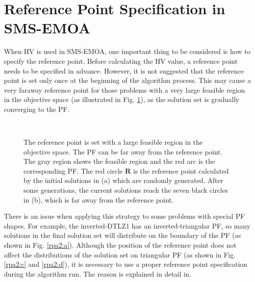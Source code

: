 \documentclass[conference]{IEEEtran}
\begin{document}
\section{Reference Point Specification in SMS-EMOA}
When HV is used in SMS-EMOA, 
one important thing to be considered is how to specify the reference point.
Before calculating the HV value, a reference point needs to be specified in advance.
However, it is not suggested that the reference point is set only once at the beginning of the algorithm process. 
This may cause a very faraway reference point 
for those problems with a very large feasible region in the objective space (as illustrated in Fig. \ref{rpa1}),
as the solution set is gradually converging to the PF. 

\begin{figure}[!t]
  \centering
  \quad
  \\
  \caption{The reference point is set with a large feasible region in the objective space.
  The PF can be far away from the reference point.
  The gray region shows the feasible region and the red arc is the corresponding PF.
  The red circle $\boldsymbol R$ is the reference point calculated by the initial solutions in (a)
  which are randomly generated. 
  After some generations, the current solutions reach the seven black circles in (b), 
  which is far away from the reference point.}
  \label{rpa1}
\end{figure}

There is an issue when applying this strategy to some problems with special PF shapes. 
For example, the inverted-DTLZ1\cite{invertedDTLZ1} has an inverted-triangular PF, 
so many solutions in the final solution set will distribute on the boundary of the PF
(as shown in Fig. \ref{rpa2:a})\cite{hisao:RPexplanation, hisao:RPspecify, hisao:dynamic}. 
Although the position of the reference point does not affect the distributions of the solution set 
on triangular PF 
(as shown in Fig. \ref{rpa2:c} and \ref{rpa2:d}), 
it is necessary to use a proper reference point specification during the algorithm run.
The reason is explained in detail in\cite{hisao:RPexplanation}.
\end{document}
